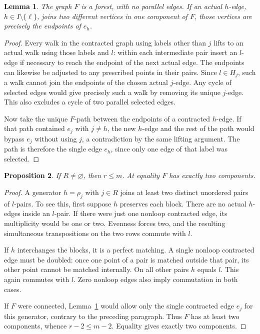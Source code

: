 \documentclass[11pt,a4paper]{article}
\newtheorem{lemma}{Lemma}
\newtheorem{proposition}[lemma]{Proposition}
\begin{document}
\begin{lemma}\label{forest}
The graph $F$ is a forest, with no parallel edges. If an actual
$h$-edge, $h\in I\setminus\{\ell\}$, joins two different
vertices in one component of $F$, those vertices are precisely
the endpoints of $e_h$.
\end{lemma}
\begin{proof}
Every walk in the contracted graph using labels other than $j$
lifts to an actual walk using those labels and $l$: within each
intermediate pair insert an $l$-edge if necessary to reach the
endpoint of the next actual edge. The endpoints can likewise be
adjusted to any prescribed points in their pairs. Since $l\in H_j$,
such a walk cannot join the endpoints of the chosen actual $j$-edge.
Any cycle of selected edges would give precisely such a walk by
removing its unique $j$-edge. This also excludes a cycle of two
parallel selected edges.

Now take the unique $F$-path between the endpoints of a contracted
$h$-edge. If that path contained $e_j$ with $j\ne h$, the new
$h$-edge and the rest of the path would bypass $e_j$ without using
$j$, a contradiction by the same lifting argument. The path is
therefore the single edge $e_h$, since only one edge of that label
was selected.
\end{proof}

\begin{proposition}\label{rankbound}
If $R\ne\varnothing$, then $r\le m$. At equality $F$ has exactly
two components.
\end{proposition}
\begin{proof}
A generator $h=\rho_j$ with $j\in R$ joins at least two distinct
unordered pairs of $l$-pairs. To see this, first suppose $h$ preserves
each block. There are no actual $h$-edges inside an $l$-pair. If
there were just one nonloop contracted edge, its multiplicity would
be one or two. Evenness forces two, and the resulting simultaneous
transpositions on the two rows commute with $l$.

If $h$ interchanges the blocks, it is a perfect matching. A single
nonloop contracted edge must be doubled: once one point of a pair
is matched outside that pair, its other point cannot be matched
internally. On all other pairs $h$ equals $l$. This again commutes
with $l$. Zero nonloop edges also imply commutation in both cases.

If $F$ were connected, Lemma~\ref{forest} would allow only the
single contracted edge $e_j$ for this generator, contrary to the
preceding paragraph. Thus $F$ has at least two components, whence
$r-2\le m-2$. Equality gives exactly two components.
\end{proof}
\end{document}

